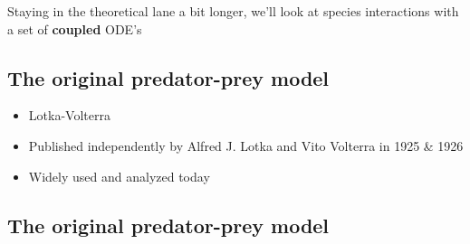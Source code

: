 \documentclass[
  letterpaper,
  DIV=11,
  numbers=noendperiod]{scrartcl}
\begin{document}
Staying in the theoretical lane a bit longer, we'll look at species
interactions with a set of \textbf{coupled} ODE's

\hypertarget{the-original-predator-prey-model}{%
\subsection{The original predator-prey
model}\label{the-original-predator-prey-model}}

\begin{itemize}
\item
  Lotka-Volterra
\item
  Published independently by Alfred J. Lotka and Vito Volterra in 1925
  \& 1926
\item
  Widely used and analyzed today
\end{itemize}

\hypertarget{the-original-predator-prey-model-1}{%
\subsection{The original predator-prey
model}\label{the-original-predator-prey-model-1}}
\end{document}
